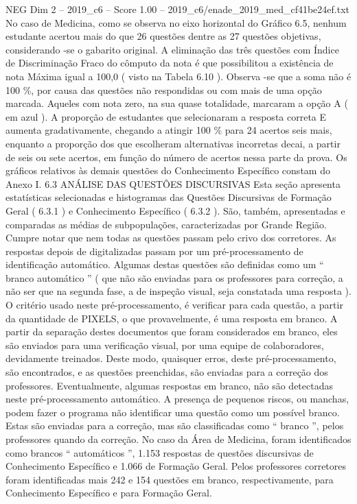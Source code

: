 \begin{textsample}{NEG Dim 2 – 2019\_c6 – Score 1.00 – 2019\_c6/enade\_2019\_med\_cf41be24ef.txt}
No caso de Medicina, como se observa no eixo horizontal do Gráfico 6.5, nenhum estudante acertou mais do que 26 questões dentre as 27 questões objetivas, considerando -se o gabarito original.
A eliminação das três questões com Índice de Discriminação Fraco do cômputo da nota é que possibilitou a existência de nota Máxima igual a 100,0 ( visto na Tabela 6.10 ).
Observa -se que a soma não é 100 \%, por causa das questões não respondidas ou com mais de uma opção marcada.
Aqueles com nota zero, na sua quase totalidade, marcaram a opção A ( em azul ).
A proporção de estudantes que selecionaram a resposta correta E aumenta gradativamente, chegando a atingir 100 \% para 24 acertos seis mais, enquanto a proporção dos que escolheram alternativas incorretas decai, a partir de seis ou sete acertos, em função do número de acertos nessa parte da prova.
Os gráficos relativos às demais questões do Conhecimento Específico constam do Anexo I. 6.3 ANÁLISE DAS QUESTÕES DISCURSIVAS Esta seção apresenta estatísticas selecionadas e histogramas das Questões Discursivas de Formação Geral ( 6.3.1 ) e Conhecimento Específico ( 6.3.2 ).
São, também, apresentadas e comparadas as médias de subpopulações, caracterizadas por Grande Região.
Cumpre notar que nem todas as questões passam pelo crivo dos corretores.
As respostas depois de digitalizadas passam por um pré-processamento de identificação automático.
Algumas destas questões são definidas como um “ branco automático ” ( que não são enviadas para os professores para correção, a não ser que na segunda fase, a de inspeção visual, seja constatada uma resposta ).
O critério usado neste pré-processamento, é verificar para cada questão, a partir da quantidade de PIXELS, o que provavelmente, é uma resposta em branco.
A partir da separação destes documentos que foram considerados em branco, eles são enviados para uma verificação visual, por uma equipe de colaboradores, devidamente treinados.
Deste modo, quaisquer erros, deste pré-processamento, são encontrados, e as questões preenchidas, são enviadas para a correção dos professores.
Eventualmente, algumas respostas em branco, não são detectadas neste pré-processamento automático.
A presença de pequenos riscos, ou manchas, podem fazer o programa não identificar uma questão como um possível branco.
Estas são enviadas para a correção, mas são classificadas como “ branco ”, pelos professores quando da correção.
No caso da Área de Medicina, foram identificados como brancos “ automáticos ”, 1.153 respostas de questões discursivas de Conhecimento Específico e 1.066 de Formação Geral.
Pelos professores corretores foram identificadas mais 242 e 154 questões em branco, respectivamente, para Conhecimento Específico e para Formação Geral.

\end{textsample}

